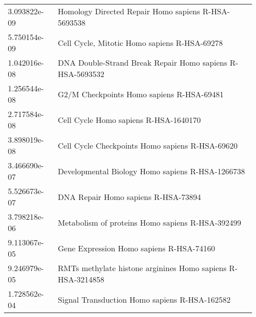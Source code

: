 \begin{longtable}{p{2.4cm}p{14.5cm}}
             3.093822e-09 &                                                                                   Homology Directed Repair Homo sapiens R-HSA-5693538 \\
             5.750154e-09 &                                                                                          Cell Cycle, Mitotic Homo sapiens R-HSA-69278 \\
             1.042016e-08 &                                                                             DNA Double-Strand Break Repair Homo sapiens R-HSA-5693532 \\
             1.256544e-08 &                                                                                             G2/M Checkpoints Homo sapiens R-HSA-69481 \\
             2.717584e-08 &                                                                                                 Cell Cycle Homo sapiens R-HSA-1640170 \\
             3.898019e-08 &                                                                                       Cell Cycle Checkpoints Homo sapiens R-HSA-69620 \\
             3.466690e-07 &                                                                                      Developmental Biology Homo sapiens R-HSA-1266738 \\
             5.526673e-07 &                                                                                                   DNA Repair Homo sapiens R-HSA-73894 \\
             3.798218e-06 &                                                                                      Metabolism of proteins Homo sapiens R-HSA-392499 \\
             9.113067e-05 &                                                                                              Gene Expression Homo sapiens R-HSA-74160 \\
             9.246979e-05 &                                                                           RMTs methylate histone arginines Homo sapiens R-HSA-3214858 \\
             1.728562e-04 &                                                                                         Signal Transduction Homo sapiens R-HSA-162582 \\
\end{longtable}


